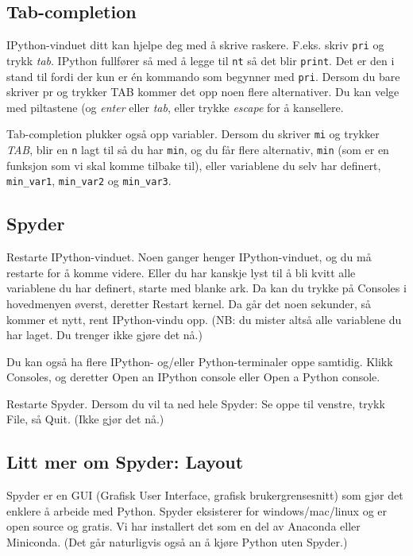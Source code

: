 \subsection{Tab-completion}

IPython-vinduet ditt kan hjelpe deg med å skrive raskere. F.eks. skriv \lstinline{pri} og trykk {\em tab}. IPython fullfører så med å legge til \lstinline{nt} så det blir \lstinline{print}. Det er den i stand til fordi der kun er én kommando som begynner med \lstinline{pri}. Dersom du bare skriver pr og trykker TAB kommer det opp noen flere alternativer. Du kan velge med piltastene (og {\em enter} eller {\em tab}, eller trykke {\em escape} for å kansellere.

Tab-completion plukker også opp variabler. Dersom du skriver \lstinline{mi} og trykker {\em TAB}, blir en \lstinline{n} lagt til så du har \lstinline{min}, og du får flere alternativ, \lstinline{min} (som er en funksjon som vi skal komme tilbake til),
eller variablene du selv har definert, \lstinline{min_var1}, \lstinline{min_var2} og \lstinline{min_var3}.


\subsection{Spyder}
Restarte IPython-vinduet. Noen ganger henger IPython-vinduet, og du må restarte for å komme videre. Eller du har kanskje lyst til å bli kvitt alle variablene du har definert, starte med blanke ark.  Da kan du trykke på Consoles i hovedmenyen øverst, deretter Restart kernel. Da går det noen sekunder, så kommer et nytt, rent IPython-vindu opp. (NB: du mister altså alle variablene du har laget. Du trenger ikke gjøre det nå.)

Du kan også ha flere IPython- og/eller Python-terminaler oppe samtidig. Klikk Consoles, og deretter Open an IPython console eller Open a Python console.

Restarte Spyder. Dersom du vil ta ned hele Spyder: Se oppe til venstre, trykk File, så Quit. (Ikke gjør det nå.) 


\subsection{Litt mer om Spyder: Layout} 
Spyder er en GUI (Grafisk User Interface, grafisk brukergrensesnitt) som gjør det enklere å arbeide med Python. Spyder eksisterer for windows/mac/linux og er open source og gratis. Vi har installert det som en del av Anaconda eller Miniconda. (Det går naturligvis også an å kjøre Python uten Spyder.)

